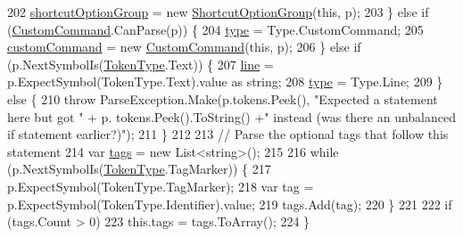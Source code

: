 \begin{DoxyCode}
202                     \hyperlink{a00160_a54d73ad69c4af4a0d61edeaea4c8ca4f}{shortcutOptionGroup} = \textcolor{keyword}{new} 
      \hyperlink{a00160_a518000e4e6219ce5f9f4229f505cd944ae8a0b2e51320b69d57d378776ee0647a}{ShortcutOptionGroup}(\textcolor{keyword}{this}, p);
203                 \} \textcolor{keywordflow}{else} \textcolor{keywordflow}{if} (\hyperlink{a00160_a518000e4e6219ce5f9f4229f505cd944af6b081742758e5cbc3a2e679e521a4fe}{CustomCommand}.CanParse(p)) \{
204                     \hyperlink{a00160_aa3fa0eb260e412720562ce06b7dc06fe}{type} = Type.CustomCommand;
205                     \hyperlink{a00160_a8a98e7d4c66f9909da865f0e671d69f2}{customCommand} = \textcolor{keyword}{new} \hyperlink{a00160_a518000e4e6219ce5f9f4229f505cd944af6b081742758e5cbc3a2e679e521a4fe}{CustomCommand}(\textcolor{keyword}{this}, p);
206                 \} \textcolor{keywordflow}{else} \textcolor{keywordflow}{if} (p.NextSymbolIs(\hyperlink{a00045_a301aa7c866593a5b625a8fc158bbeace}{TokenType}.Text)) \{
207                     \hyperlink{a00160_a37695c7b00776bb292fd64894a70fb72}{line} = p.ExpectSymbol(TokenType.Text).value as \textcolor{keywordtype}{string};
208                     \hyperlink{a00160_aa3fa0eb260e412720562ce06b7dc06fe}{type} = Type.Line;
209                 \} \textcolor{keywordflow}{else} \{
210                     \textcolor{keywordflow}{throw} ParseException.Make(p.tokens.Peek(), \textcolor{stringliteral}{"Expected a statement here but got "} + p.
      tokens.Peek().ToString() +\textcolor{stringliteral}{" instead (was there an unbalanced if statement earlier?)"});
211                 \}
212 
213                 \textcolor{comment}{// Parse the optional tags that follow this statement}
214                 var \hyperlink{a00142_a58b3a15788fd2d4127d73619dc6d04ae}{tags} = \textcolor{keyword}{new} List<string>();
215 
216                 \textcolor{keywordflow}{while} (p.NextSymbolIs(\hyperlink{a00045_a301aa7c866593a5b625a8fc158bbeace}{TokenType}.TagMarker)) \{
217                     p.ExpectSymbol(TokenType.TagMarker);
218                     var tag = p.ExpectSymbol(TokenType.Identifier).value;
219                     tags.Add(tag);
220                 \}
221 
222                 \textcolor{keywordflow}{if} (tags.Count > 0)
223                     this.tags = tags.ToArray();
224             \}
\end{DoxyCode}



